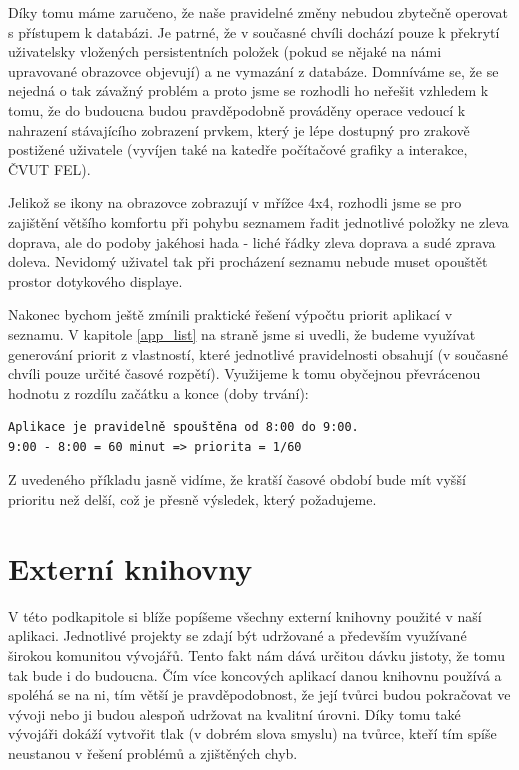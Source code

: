 \documentclass[thesis=M,czech]{FITthesis}[2012/06/26]
\begin{document}
Díky tomu máme zaručeno, že naše pravidelné změny nebudou zbytečně operovat s přístupem k databázi. Je patrné, že v současné chvíli dochází pouze k překrytí uživatelsky vložených persistentních položek (pokud se nějaké na námi upravované obrazovce objevují) a ne vymazání z databáze. Domníváme se, že se nejedná o tak závažný problém a proto jsme se rozhodli ho neřešit vzhledem k tomu, že do budoucna budou pravděpodobně prováděny operace vedoucí k nahrazení stávajícího zobrazení prvkem, který je lépe dostupný pro zrakově postižené uživatele (vyvíjen také na katedře počítačové grafiky a interakce, ČVUT FEL).

Jelikož se ikony na obrazovce zobrazují v mřížce 4x4, rozhodli jsme se pro zajištění většího komfortu při pohybu seznamem řadit jednotlivé položky ne zleva doprava, ale do podoby jakéhosi hada - liché řádky zleva doprava a sudé zprava doleva. Nevidomý uživatel tak při procházení seznamu nebude muset opouštět prostor dotykového displaye.

Nakonec bychom ještě zmínili praktické řešení výpočtu priorit aplikací v seznamu. V kapitole \ref{app_list} na straně \pageref{app_list} jsme si uvedli, že budeme využívat generování priorit z vlastností, které jednotlivé pravidelnosti obsahují (v současné chvíli pouze určité časové rozpětí). Využijeme k tomu obyčejnou převrácenou hodnotu z rozdílu začátku a konce (doby trvání):

\begin{verbatim}
Aplikace je pravidelně spouštěna od 8:00 do 9:00.
9:00 - 8:00 = 60 minut => priorita = 1/60
\end{verbatim}

Z uvedeného příkladu jasně vidíme, že kratší časové období bude mít vyšší prioritu než delší, což je přesně výsledek, který požadujeme.

\section{Externí knihovny}
V této podkapitole si blíže popíšeme všechny externí knihovny použité v naší aplikaci. Jednotlivé projekty se zdají být udržované a především využívané širokou komunitou vývojářů. Tento fakt nám dává určitou dávku jistoty, že tomu tak bude i do budoucna. Čím více koncových aplikací danou knihovnu používá a spoléhá se na ni, tím větší je pravděpodobnost, že její tvůrci budou pokračovat ve vývoji nebo ji budou alespoň udržovat na kvalitní úrovni. Díky tomu také vývojáři dokáží vytvořit tlak (v dobrém slova smyslu) na tvůrce, kteří tím spíše neustanou v řešení problémů a zjištěných chyb.
\end{document}
